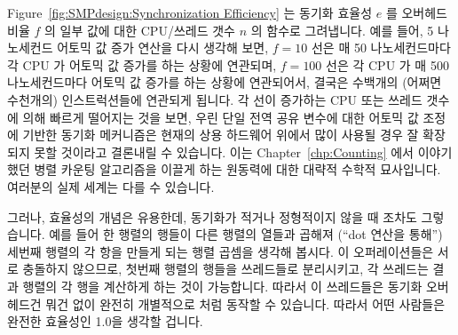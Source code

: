 Figure~\ref{fig:SMPdesign:Synchronization Efficiency} 는 동기화 효율성 $e$ 를
오버헤드 비율 $f$ 의 일부 값에 대한 CPU/쓰레드 갯수 $n$ 의 함수로 그려냅니다.
예를 들어, 5 나노세컨드 어토믹 값 증가 연산을 다시 생각해 보면, $f=10$ 선은 매
50 나노세컨드마다 각 CPU 가 어토믹 값 증가를 하는 상황에 연관되며, $f=100$ 선은
각 CPU 가 매 500 나노세컨드마다 어토믹 값 증가를 하는 상황에 연관되어서,
결국은 수백개의 (어쩌면 수천개의) 인스트럭션들에 연관되게 됩니다.
각 선이 증가하는 CPU 또는 쓰레드 갯수에 의해 빠르게 떨어지는 것을 보면, 우린
단일 전역 공유 변수에 대한 어토믹 값 조정에 기반한 동기화 메커니즘은 현재의
상용 하드웨어 위에서 많이 사용될 경우 잘 확장되지 못할 것이라고 결론내릴 수
있습니다.
이는 Chapter~\ref{chp:Counting} 에서 이야기 했던 병렬 카운팅 알고리즘을 이끌게
하는 원동력에 대한 대략적 수학적 묘사입니다.
여러분의 실제 세계는 다를 수 있습니다.

그러나, 효율성의 개념은 유용한데, 동기화가 적거나 정형적이지 않을 때 조차도
그렇습니다.
예를 들어 한 행렬의 행들이 다른 행렬의 열들과 곱해져 (``dot 연산을 통해'')
세번째 행렬의 각 항을 만들게 되는 행렬 곱셈을 생각해 봅시다.
이 오퍼레이션들은 서로 충돌하지 않으므로, 첫번째 행렬의 행들을 쓰레드들로
분리시키고, 각 쓰레드는 결과 행렬의 각 행을 계산하게 하는 것이 가능합니다.
따라서 이 쓰레드들은 동기화 오버헤드건 뭐건 없이 완전히 개별적으로
 처럼 동작할 수 있습니다.
따라서 어떤 사람들은 완전한 효율성인 1.0을 생각할 겁니다.

\iffalse

